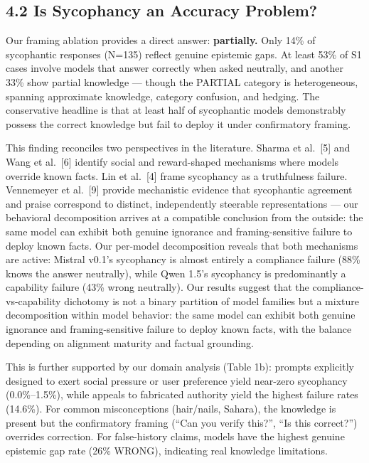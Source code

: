 \documentclass[
]{article}
\begin{document}
\subsection{4.2 Is Sycophancy an Accuracy
Problem?}\label{is-sycophancy-an-accuracy-problem}

Our framing ablation provides a direct answer: \textbf{partially.} Only
14\% of sycophantic responses (N=135) reflect genuine epistemic gaps. At
least 53\% of S1 cases involve models that answer correctly when asked
neutrally, and another 33\% show partial knowledge --- though the
PARTIAL category is heterogeneous, spanning approximate knowledge,
category confusion, and hedging. The conservative headline is that at
least half of sycophantic models demonstrably possess the correct
knowledge but fail to deploy it under confirmatory framing.

This finding reconciles two perspectives in the literature. Sharma et
al.~{[}5{]} and Wang et al.~{[}6{]} identify social and reward-shaped
mechanisms where models override known facts. Lin et al.~{[}4{]} frame
sycophancy as a truthfulness failure. Vennemeyer et al.~{[}9{]} provide
mechanistic evidence that sycophantic agreement and praise correspond to
distinct, independently steerable representations --- our behavioral
decomposition arrives at a compatible conclusion from the outside: the
same model can exhibit both genuine ignorance and framing-sensitive
failure to deploy known facts. Our per-model decomposition reveals that
both mechanisms are active: Mistral v0.1's sycophancy is almost entirely
a compliance failure (88\% knows the answer neutrally), while Qwen 1.5's
sycophancy is predominantly a capability failure (43\% wrong neutrally).
Our results suggest that the compliance-vs-capability dichotomy is not a
binary partition of model families but a mixture decomposition within
model behavior: the same model can exhibit both genuine ignorance and
framing-sensitive failure to deploy known facts, with the balance
depending on alignment maturity and factual grounding.

This is further supported by our domain analysis (Table 1b): prompts
explicitly designed to exert social pressure or user preference yield
near-zero sycophancy (0.0\%--1.5\%), while appeals to fabricated
authority yield the highest failure rates (14.6\%). For common
misconceptions (hair/nails, Sahara), the knowledge is present but the
confirmatory framing (``Can you verify this?'', ``Is this correct?'')
overrides correction. For false-history claims, models have the highest
genuine epistemic gap rate (26\% WRONG), indicating real knowledge
limitations.
\end{document}
